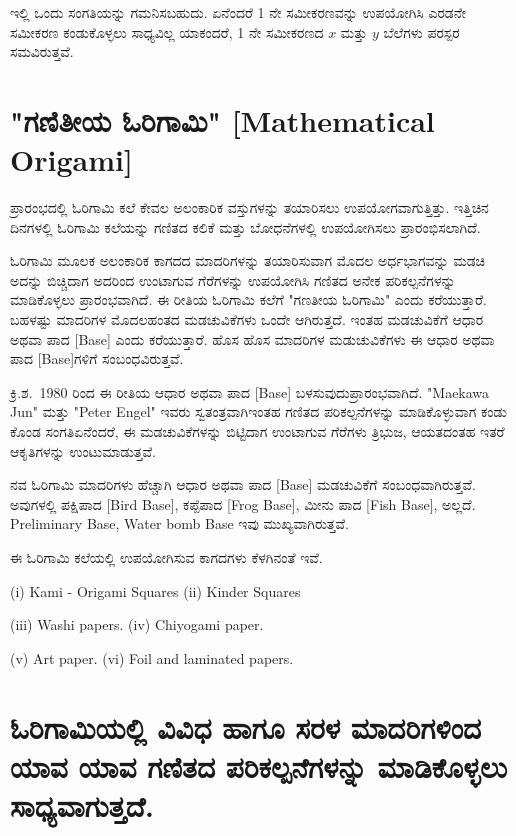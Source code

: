 \smallskip

ಇಲ್ಲಿ ಒಂದು ಸಂಗತಿಯನ್ನು ಗಮನಿಸಬಹುದು. ಏನೆಂದರೆ 1 ನೇ ಸಮೀಕರಣವನ್ನು ಉಪಯೋಗಿಸಿ ಎರಡನೇ ಸಮೀಕರಣ ಕಂಡುಕೊಳ್ಳಲು ಸಾಧ್ಯವಿಲ್ಲ ಯಾಕಂದರೆ, 1 ನೇ ಸಮೀಕರಣದ $x$ ಮತ್ತು $y$  ಬೆಲೆಗಳು ಪರಸ್ಪರ ಸಮವಿರುತ್ತವೆ. 


\section{"ಗಣಿತೀಯ ಓರಿಗಾಮಿ" [Mathematical Origami]}\label{sec1.4}%
ಪ್ರಾರಂಭದಲ್ಲಿ ಓರಿಗಾಮಿ ಕಲೆ ಕೇವಲ ಅಲಂಕಾರಿಕ ವಸ್ತುಗಳನ್ನು ತಯಾರಿಸಲು ಉಪಯೋಗವಾಗುತ್ತಿತ್ತು. ಇತ್ತಿಚಿನ ದಿನಗಳಲ್ಲಿ ಓರಿಗಾಮಿ ಕಲೆಯನ್ನು ಗಣಿತದ ಕಲಿಕೆ ಮತ್ತು ಬೋಧನೆಗಳಲ್ಲಿ ಉಪಯೋಗಿಸಲು ಪ್ರಾರಂಭಿಸಲಾಗಿದೆ. 

\smallskip

ಓರಿಗಾಮಿ ಮೂಲಕ ಅಲಂಕಾರಿಕ ಕಾಗದದ ಮಾದರಿಗಳನ್ನು ತಯಾರಿಸುವಾಗ ಮೊದಲ ಅರ್ಧಭಾಗವನ್ನು ಮಡಚಿ ಅದನ್ನು ಬಿಚ್ಚಿದಾಗ ಅದರಿಂದ ಉಂಟಾಗುವ ಗೆರೆಗಳನ್ನು ಉಪಯೋಗಿಸಿ ಗಣಿತದ ಅನೇಕ ಪರಿಕಲ್ಪನೆಗಳನ್ನು ಮಾಡಿಕೊಳ್ಳಲು ಪ್ರಾರಂಭವಾಗಿದೆ. ಈ ರೀತಿಯ ಓರಿಗಾಮಿ ಕಲೆಗೆ "ಗಣತೀಯ ಓರಿಗಾಮಿ" ಎಂದು ಕರೆಯುತ್ತಾರೆ. ಬಹಳಷ್ಟು ಮಾದರಿಗಳ ಮೊದಲಹಂತದ ಮಡಚುವಿಕೆಗಳು ಒಂದೇ ಆಗಿರುತ್ತದೆ. ಇಂತಹ ಮಡಚುವಿಕೆಗೆ ಆಧಾರ ಅಥವಾ ಪಾದ [Base] ಎಂದು ಕರೆಯುತ್ತಾರೆ. ಹೊಸ ಹೊಸ ಮಾದರಿಗಳ ಮಡುಚುವಿಕೆ\break ಗಳು ಈ ಆಧಾರ ಅಥವಾ ಪಾದ [Base]ಗಳಿಗೆ ಸಂಬಂಧವಿರುತ್ತವೆ.

\smallskip

ಕ್ರಿ.ಶ.~1980 ರಿಂದ ಈ ರೀತಿಯ ಆಧಾರ ಅಥವಾ ಪಾದ [Base] ಬಳಸುವುದು\break ಪ್ರಾರಂಭವಾಗಿದೆ. "Maekawa Jun" ಮತ್ತು "Peter Engel" ಇವರು ಸ್ವತಂತ್ರವಾಗಿ\break ಇಂತಹ ಗಣಿತದ ಪರಿಕಲ್ಪನೆಗಳನ್ನು ಮಾಡಿಕೊಳ್ಳುವಾಗ ಕಂಡು ಕೊಂಡ ಸಂಗತಿ\break ಏನೆಂದರೆ, ಈ ಮಡಚುವಿಕೆಗಳನ್ನು ಬಿಟ್ಟಿದಾಗ ಉಂಟಾಗುವ ಗೆರೆಗಳು ತ್ರಿಭುಜ, ಆಯತ\break ದಂತಹ ಇತರೆ ಆಕೃತಿಗಳನ್ನು ಉಂಟುಮಾಡುತ್ತವೆ. 
\smallskip

ನವ ಓರಿಗಾಮಿ ಮಾದರಿಗಳು ಹೆಚ್ಚಾಗಿ ಆಧಾರ ಅಥವಾ ಪಾದ [Base] ಮಡಚುವಿ\break ಕೆಗೆ ಸಂಬಂಧವಾಗಿರುತ್ತವೆ. ಅವುಗಳಲ್ಲಿ ಪಕ್ಷಿಪಾದ [Bird Base], ಕಪ್ಪೆಪಾದ [Frog Base], ಮೀನು ಪಾದ [Fish Base], ಅಲ್ಲದೆ. Preliminary Base, Water bomb Base ಇವು ಮುಖ್ಯವಾಗಿರುತ್ತವೆ. 

\smallskip
ಈ ಓರಿಗಾಮಿ ಕಲೆಯಲ್ಲಿ ಉಪಯೋಗಿಸುವ ಕಾಗದಗಳು ಕೆಳಗಿನಂತೆ ಇವೆ. 

\smallskip

(i) Kami - Origami Squares (ii) Kinder Squares

\smallskip
 (iii) Washi papers. (iv) Chiyogami paper. 
 
 \smallskip
 (v) Art paper. (vi) Foil and laminated papers.


\section{ಓರಿಗಾಮಿಯಲ್ಲಿ ವಿವಿಧ ಹಾಗೂ ಸರಳ ಮಾದರಿಗಳಿಂದ ಯಾವ ಯಾವ ಗಣಿತದ ಪರಿಕಲ್ಪನೆಗಳನ್ನು ಮಾಡಿಕೊಳ್ಳಲು ಸಾಧ್ಯವಾಗುತ್ತದೆ. }\label{sec1.5}%

